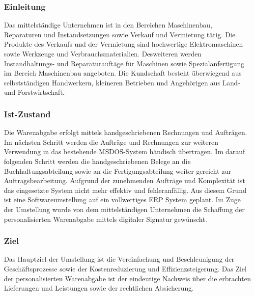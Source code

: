 \subsubsection*{Einleitung}
Das mittelständige Unternehmen ist in den Bereichen Maschinenbau, Reparaturen und Instandsetzungen sowie Verkauf und Vermietung tätig. Die Produkte des Verkaufs und der Vermietung sind hochwertige Elektromaschinen sowie Werkzeuge und Verbrauchsmaterialien. Desweiteren werden Instandhaltungs- und Reparaturauftäge für Maschinen sowie Spezialanfertigung im Bereich Maschinenbau angeboten. Die Kundschaft besteht überwiegend aus selbstständigen Handwerkern, kleineren Betrieben und Angehörigen aus Land- und Forstwirtschaft.
\subsubsection*{Ist-Zustand}
Die Warenabgabe erfolgt mittels handgeschriebenen Rechnungen und Aufträgen. Im nächsten Schritt werden die Aufträge und Rechnungen zur weiteren Verwendung in das bestehende MSDOS-System händisch übertragen. Im darauf folgenden Schritt werden die handgeschriebenen Belege an die Buchhaltungsabteilung sowie an die Fertigungsabteilung weiter gereicht zur Auftragsbearbeitung. Aufgrund der zunehmenden Aufträge und Komplexität ist das eingesetzte System nicht mehr effektiv und fehleranfällig. Aus diesem Grund ist eine Softwareumstellung auf ein vollwertiges ERP System geplant. Im Zuge der Umstellung wurde von dem mittelständigen Unternehmen die Schaffung der personalisierten Warenabgabe mittels digitaler Signatur gewünscht.
\subsubsection*{Ziel}
Das Hauptziel der Umstellung ist die Vereinfachung und Beschleunigung der Geschäftsprozesse sowie der Kostenreduzierung und Effizienzsteigerung. Das Ziel der personalisierten Warenabgabe ist der eindeutige Nachweis über die erbrachten Lieferungen und Leistungen sowie der rechtlichen Absicherung. \cite{einleitung1}